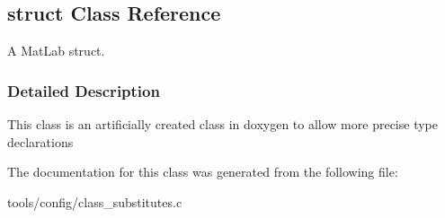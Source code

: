 \hypertarget{classstruct}{}\subsection{struct Class Reference}
\label{classstruct}


A Mat\+Lab struct.  




\subsubsection{Detailed Description}
This class is an artificially created class in doxygen to allow more precise type declarations 

The documentation for this class was generated from the following file\+:\begin{DoxyCompactItemize}
\item 
tools/config/class\+\_\+substitutes.\+c\end{DoxyCompactItemize}
